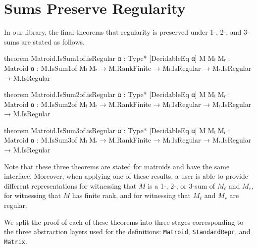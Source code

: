 \section{Sums Preserve Regularity}

In our library, the final theorems that regularity is preserved under 1-, 2-, and 3-sums are stated as follows.
\begin{leancode}
theorem Matroid.IsSum1of.isRegular {α : Type*}
    [DecidableEq α] {M Mₗ Mᵣ : Matroid α} :
  M.IsSum1of Mₗ Mᵣ → M.RankFinite →
    Mₗ.IsRegular → Mᵣ.IsRegular → M.IsRegular
\end{leancode}
\begin{leancode}
theorem Matroid.IsSum2of.isRegular {α : Type*}
    [DecidableEq α] {M Mₗ Mᵣ : Matroid α} :
  M.IsSum2of Mₗ Mᵣ → M.RankFinite →
    Mₗ.IsRegular → Mᵣ.IsRegular → M.IsRegular
\end{leancode}
\begin{leancode}
theorem Matroid.IsSum3of.isRegular {α : Type*}
    [DecidableEq α] {M Mₗ Mᵣ : Matroid α} :
  M.IsSum3of Mₗ Mᵣ → M.RankFinite →
    Mₗ.IsRegular → Mᵣ.IsRegular → M.IsRegular
\end{leancode}
Note that these three theorems are stated for matroids and have the same interface. Moreover, when applying one of these results, a user is able to provide different representations for witnessing that $M$ is a 1-, 2-, or 3-sum of $M_{\ell}$ and $M_{r}$, for witnessing that $M$ has finite rank, and for witnessing that $M_{\ell}$ and $M_{r}$ are regular.%

We split the proof of each of these theorems into three stages corresponding to the three abstraction layers used for the definitions: \texttt{Matroid}, \texttt{StandardRepr}, and \texttt{Matrix}. 

